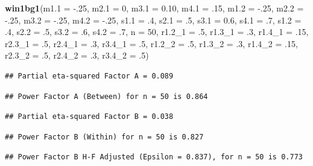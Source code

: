 \documentclass[]{book}
\newenvironment{Shaded}{\begin{snugshade}}{\end{snugshade}}
\newcommand{\DataTypeTok}[1]{\textcolor[rgb]{0.13,0.29,0.53}{#1}}
\newcommand{\DecValTok}[1]{\textcolor[rgb]{0.00,0.00,0.81}{#1}}
\newcommand{\FloatTok}[1]{\textcolor[rgb]{0.00,0.00,0.81}{#1}}
\newcommand{\KeywordTok}[1]{\textcolor[rgb]{0.13,0.29,0.53}{\textbf{#1}}}
\newcommand{\NormalTok}[1]{#1}
\begin{document}
\begin{Shaded}
\begin{Highlighting}[]
\KeywordTok{win1bg1}\NormalTok{(}\DataTypeTok{m1.1 =} \FloatTok{-.25}\NormalTok{, }\DataTypeTok{m2.1 =} \DecValTok{0}\NormalTok{, }\DataTypeTok{m3.1 =} \FloatTok{0.10}\NormalTok{, }\DataTypeTok{m4.1 =} \FloatTok{.15}\NormalTok{, }
        \DataTypeTok{m1.2 =} \FloatTok{-.25}\NormalTok{, }\DataTypeTok{m2.2 =} \FloatTok{-.25}\NormalTok{, }\DataTypeTok{m3.2 =} \FloatTok{-.25}\NormalTok{, }\DataTypeTok{m4.2 =} \FloatTok{-.25}\NormalTok{, }
        \DataTypeTok{s1.1 =} \FloatTok{.4}\NormalTok{, }\DataTypeTok{s2.1 =} \FloatTok{.5}\NormalTok{, }\DataTypeTok{s3.1 =} \FloatTok{0.6}\NormalTok{, }\DataTypeTok{s4.1 =} \FloatTok{.7}\NormalTok{, }\DataTypeTok{s1.2 =} \FloatTok{.4}\NormalTok{, }
        \DataTypeTok{s2.2 =} \FloatTok{.5}\NormalTok{, }\DataTypeTok{s3.2 =} \FloatTok{.6}\NormalTok{, }\DataTypeTok{s4.2 =} \FloatTok{.7}\NormalTok{,}
        \DataTypeTok{n =} \DecValTok{50}\NormalTok{, }
        \DataTypeTok{r1.2_1 =} \FloatTok{.5}\NormalTok{, }\DataTypeTok{r1.3_1 =} \FloatTok{.3}\NormalTok{, }\DataTypeTok{r1.4_1 =} \FloatTok{.15}\NormalTok{, }
        \DataTypeTok{r2.3_1 =} \FloatTok{.5}\NormalTok{, }\DataTypeTok{r2.4_1 =} \FloatTok{.3}\NormalTok{, }\DataTypeTok{r3.4_1 =} \FloatTok{.5}\NormalTok{, }
        \DataTypeTok{r1.2_2 =} \FloatTok{.5}\NormalTok{, }\DataTypeTok{r1.3_2 =} \FloatTok{.3}\NormalTok{, }\DataTypeTok{r1.4_2 =} \FloatTok{.15}\NormalTok{, }
        \DataTypeTok{r2.3_2 =} \FloatTok{.5}\NormalTok{, }\DataTypeTok{r2.4_2 =} \FloatTok{.3}\NormalTok{, }\DataTypeTok{r3.4_2 =} \FloatTok{.5}\NormalTok{)}
\end{Highlighting}
\end{Shaded}

\begin{verbatim}
## Partial eta-squared Factor A = 0.089
\end{verbatim}

\begin{verbatim}
## Power Factor A (Between) for n = 50 is 0.864
\end{verbatim}

\begin{verbatim}
## Partial eta-squared Factor B = 0.038
\end{verbatim}

\begin{verbatim}
## Power Factor B (Within) for n = 50 is 0.827
\end{verbatim}

\begin{verbatim}
## Power Factor B H-F Adjusted (Epsilon = 0.837), for n = 50 is 0.773
\end{verbatim}
\end{document}
